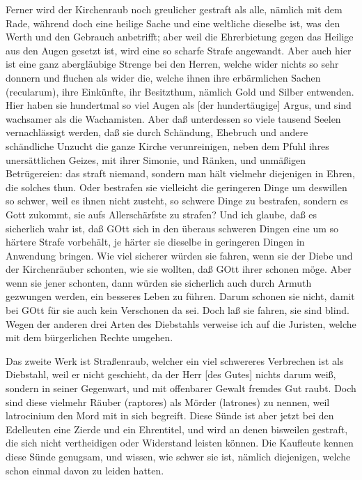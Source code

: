 Ferner wird der Kirchenraub noch greulicher gestraft als alle, nämlich mit dem Rade, während doch eine heilige Sache und eine weltliche dieselbe ist, was den Werth und den Gebrauch anbetrifft; aber weil die Ehrerbietung gegen das Heilige aus den Augen gesetzt ist, wird eine so scharfe Strafe angewandt. Aber auch hier ist eine ganz abergläubige Strenge bei den Herren, welche wider nichts so sehr donnern und fluchen als wider die, welche ihnen ihre erbärmlichen Sachen (recularum), ihre Einkünfte, ihr Besitzthum, nämlich Gold und Silber entwenden. Hier haben sie hundertmal so viel Augen als [der hundertäugige] Argus, und sind wachsamer als die Wachamisten. Aber daß unterdessen so viele tausend Seelen vernachlässigt werden, daß sie durch Schändung, Ehebruch und andere schändliche Unzucht die ganze Kirche verunreinigen, neben dem Pfuhl ihres unersättlichen Geizes, mit ihrer Simonie, und Ränken, und unmäßigen Betrügereien: das straft niemand, sondern man hält vielmehr diejenigen in Ehren, die solches thun. Oder bestrafen sie vielleicht die geringeren Dinge um deswillen so schwer, weil es ihnen nicht zusteht, so schwere Dinge zu bestrafen, sondern es Gott zukommt, sie aufs Allerschärfste zu strafen? Und ich glaube, daß es sicherlich wahr ist, daß GOtt sich in den überaus schweren Dingen eine um so härtere Strafe vorbehält, je härter sie dieselbe in geringeren Dingen in Anwendung bringen. Wie viel sicherer würden sie fahren, wenn sie der Diebe und der Kirchenräuber schonten, wie sie wollten, daß GOtt ihrer schonen möge. Aber wenn sie jener schonten, dann würden sie sicherlich auch durch Armuth gezwungen werden, ein besseres Leben zu führen. Darum schonen sie nicht, damit bei GOtt für sie auch kein Verschonen da sei. Doch laß sie fahren, sie sind blind. Wegen der anderen drei Arten des Diebstahls verweise ich auf die Juristen, welche mit dem bürgerlichen Rechte umgehen.

Das zweite Werk ist Straßenraub, welcher ein viel schwereres Verbrechen ist als Diebstahl, weil er nicht geschieht, da der Herr [des Gutes] nichts darum weiß, sondern in seiner Gegenwart, und mit offenbarer Gewalt fremdes Gut raubt. Doch sind diese vielmehr Räuber (raptores) als Mörder (latrones) zu nennen, weil latrocinium den Mord mit in sich begreift. Diese Sünde ist aber jetzt bei den Edelleuten eine Zierde und ein Ehrentitel, und wird an denen bisweilen gestraft, die sich nicht vertheidigen oder Widerstand leisten können. Die Kaufleute kennen diese Sünde genugsam, und wissen, wie schwer sie ist, nämlich diejenigen, welche schon einmal davon zu leiden hatten.


